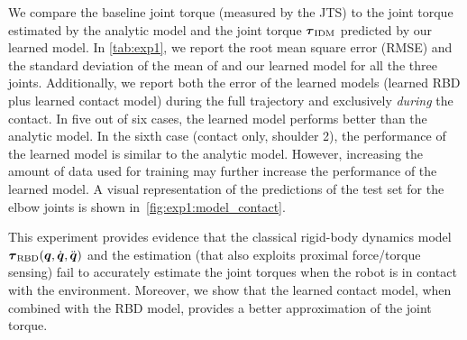     
	We compare the baseline joint torque (measured by the JTS) to the joint torque estimated by the analytic model \idyn{} and  the joint torque $\boldsymbol {\tau}_\text{IDM}$ predicted by our learned model.
	In \tab\ref{tab:exp1}, we report the root mean square error (RMSE) and the standard deviation of the mean of \idyn{} and our learned model for all the three joints.
	Additionally, we report both the error of the learned models (learned RBD plus learned contact model) during the full trajectory and exclusively \textit{during} the contact. 
	In five out of six cases, the learned model performs better than the analytic model. 
    In the sixth case (contact only, shoulder 2), the performance of the learned model is similar to the analytic model.
    However, increasing the amount of data used for training may further increase the performance of the learned model. 
	A visual representation of the predictions of the test set for the elbow joints is shown in~\fig\ref{fig:exp1:model_contact}.
	
    This experiment provides evidence that the classical rigid-body dynamics model $\boldsymbol {\tau}_\text{RBD}(\boldsymbol q,\dot{\boldsymbol q},\ddot{\boldsymbol q})$ and the \idyn{} estimation (that also exploits proximal force/torque sensing) fail to accurately estimate the joint torques when the robot is in contact with the environment. 
	Moreover, we show that the learned contact model, when combined with the RBD model, provides a better approximation of the joint torque.
	




